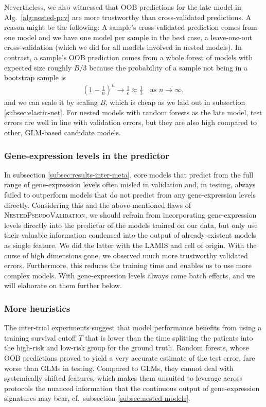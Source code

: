 Nevertheless, we also witnessed that OOB predictions for the late model in Alg.\ 
\ref{alg:nested-pcv} are more trustworthy than cross-validated predictions. A reason might be the 
following: A sample's cross-validated prediction comes 
from one model and we have one model per sample in the best case, a leave-one-out cross-validation 
(which we did for all models involved in nested models). In contrast, a sample's OOB prediction 
comes from a whole forest of models with expected size roughly $B/3$ because the probability of a 
sample not being in a bootstrap sample is
\begin{align}
    \left( 1 - \frac{1}{n} \right)^n \to \frac{1}{e} \approx \frac{1}{3} \quad \text{as } n \to 
    \infty,
\end{align}
and we can scale it by scaling $B$, which is cheap as we laid out in subsection 
\ref{subsec:elastic-net}. For nested models with random forests as the late model, test errors 
are well in line with validation errors, but they are also high compared to other, GLM-based 
candidate models.

\subsubsection{Gene-expression levels in the predictor}

In subsection \ref{subsec:results-inter-meta}, core models that predict from the full range
of gene-expression levels often misled in validation and, in testing, always failed to outperform 
models that do not predict from any gene-expression levels directly.
Considering this and the above-mentioned flaws of \textsc{NestedPseudoValidation}, we should refrain from 
incorporating gene-expression levels directly into the predictor of the models 
trained on our data, but only use their valuable information condensed into the output of 
already-existent models as single feature. We did the latter with the LAMIS and cell of origin. 
With the curse of high dimensions gone, we observed much more 
trustworthy validated errors. Furthermore, this reduces the training time and enables us to use 
more complex models. With gene-expression levels 
always come batch effects, and we will elaborate on them further below.

\subsubsection{More heuristics}

The inter-trial experiments suggest that model performance benefits from using a training 
survival cutoff $T$ that is lower than the time splitting the patients into the high-risk and 
low-risk group for the ground truth. Random forests, whose OOB predictions proved to yield a very 
accurate estimate of the test error, fare worse than GLMs in testing. Compared to GLMs, they 
cannot deal with systemically shifted features, which makes them unsuited to leverage across 
protocols the nuanced information that the continuous output of gene-expression signatures 
may bear, cf.\ subsection \ref{subsec:nested-models}.

